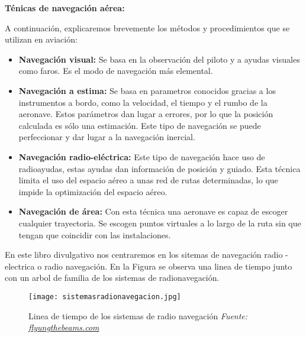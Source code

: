 \pagestyle{fancy}
\begin{nosangria}
\textbf{\Huge{Ténicas de navegación aérea:}}\\
\end{nosangria}

A continuación, explicaremos brevemente los métodos y procedimientos que se utilizan en aviación:
\begin{itemize}
\item \textbf{Navegación visual:} Se basa en la observación del piloto y a ayudas visuales como faros. Es el modo de navegación más elemental.\\

\item \textbf{Navegación a estima:} Se basa en parametros conocidos gracias a los instrumentos a bordo, como la velocidad, el tiempo y el rumbo de la aeronave. Estos parámetros dan lugar a errores, por lo que la posición calculada es sólo una estimación. Este tipo de navegación se puede perfeccionar y dar lugar a la navegación inercial.\\

\item \textbf{Navegación radio-eléctrica:} Este tipo de navegación hace uso de radioayudas, estas ayudas dan información de posición y guiado. Esta técnica limita el uso del espacio aéreo a unas red de rutas determinadas, lo que impide la optimización del espacio aéreo.\\

\item \textbf{Navegación de área:} Con esta técnica una aeronave es capaz de escoger cualquier trayectoria. Se escogen puntos virtuales a lo largo de la ruta sin que tengan que coincidir con las instalaciones. \\
\end{itemize}

En este libro divulgativo nos centraremos en los sitemas de navegación radio - electrica o radio navegación. En la Figura \label{fig:radionavegacionxd} se observa una linea de tiempo junto con un arbol de familia de los sistemas de radionavegación.

\begin{figure}[H] 
	\centering %
	\texttt{[image: sistemasradionavegacion.jpg]} %
	\caption{\centering Linea de tiempo de los sistemas de radio navegación \textit{Fuente: \href{https://flyingthebeams.com/early-radio-nav-1960-2000}{flyungthebeams.com}}}
	\label{fig:radionavegacionxd} %
\end{figure}

\newpage